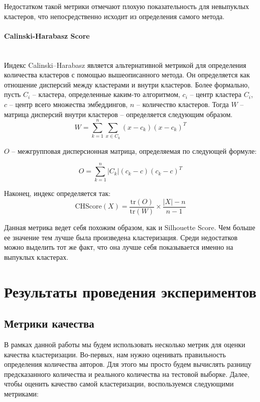 Недостатком такой метрики отмечают плохую показательность для невыпуклых кластеров, что непосредственно исходит из определения самого метода.

\paragraph{Calinski-Harabasz Score}\mbox{} \\

Индекс Calinski–Harabasz является альтернативной метрикой для определения количества кластеров с помощью вышеописанного метода. Он определяется как отношение дисперсий между кластерами и внутри кластеров. Более формально, пусть $C_i$ -- кластера, определенные каким-то алгоритмом, $c_i$ -- центр кластера $C_i$, $c$ -- центр всего множества эмбеддингов, $n$ -- количество кластеров. Тогда $W$ -- матрица дисперсий внутри кластеров -- определяется следующим образом.
$$
W = \sum_{k = 1}^{n} \sum_{x \in C_k} (x - c_k)(x - c_k)^T
$$

\bigskip
\noindent
$O$ -- межгрупповая дисперсионная матрица, определяемая по следующей формуле:

$$
O = \sum_{k = 1}^n |C_k|(c_k - c)(c_k - c)^T
$$

\smallskip
\noindent

Наконец, индекс определяется так:
$$
\text{CHScore}(X) = \frac{\text{tr}(O)}{\text{tr}(W)} \times \frac{|X| - n}{n - 1}
$$

Данная метрика ведет себя похожим образом, как и Silhouette Score. Чем больше ее значение тем лучше была произведена кластеризация. Среди недостатков можно выделить тот же факт, что она лучше себя показывается именно на выпуклых кластерах.

\newpage
\section{Результаты проведения экспериментов}

\subsection{Метрики качества}

В рамках данной работы мы будем использовать несколько метрик для оценки качества кластеризации. Во-первых, нам нужно оценивать правильность определения количества авторов. Для этого мы просто будем вычислять разницу предсказанного количества и реального количества на тестовой выборке. Далее, чтобы оценить качество самой кластеризации, воспользуемся следующими метриками:

